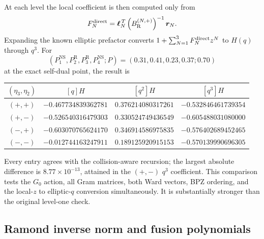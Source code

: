 \documentclass[11pt]{article}
\newcommand{\NS}{\mathrm{NS}}
\newcommand{\R}{\mathrm{R}}
\begin{document}
At each level the local coefficient is then computed only from
\begin{equation}
 F_N^{\rm direct}
 =\boldsymbol\ell_N^{\,T}
 \left(B_{\R}^{(N,+)}\right)^{-1}
 \boldsymbol r_N.
 \label{eq:r-direct-level-n}
\end{equation}
Expanding the known elliptic prefactor converts
$1+\sum_{N=1}^3F_N^{\rm direct}z^N$ to $H(q)$ through $q^3$.  For
\begin{equation}
 (P_1^{\NS},P_2^{\R},P_3^{\R},P_4^{\NS};P)
 =(0.31,0.41,0.23,0.37;0.70)
 \end{equation}
at the exact self-dual point, the result is
\begin{center}
\begin{tabular}{@{}cccc@{}}
\toprule
$(\eta_3,\eta_2)$ & $[q]H$ & $[q^2]H$ & $[q^3]H$\\
\midrule
$(+,+)$ & $-0.467734839362781$ & $0.376214080317261$
 & $-0.532846461739354$\\
$(+,-)$ & $-0.526540316479303$ & $0.330524749436549$
 & $-0.605488031080000$\\
$(-,+)$ & $-0.603070765624170$ & $0.346914586975835$
 & $-0.576402689452465$\\
$(-,-)$ & $-0.012744163247911$ & $0.189125920915153$
 & $-0.570139990696305$\\
\bottomrule
\end{tabular}
\end{center}
Every entry agrees with the collision-aware recursion; the largest absolute
difference is $8.77\times10^{-13}$, attained in the $(+,-)$ $q^3$
coefficient.  This comparison tests the $G_0$ action, all Gram matrices,
both Ward vectors, BPZ ordering, and the local-$z$ to elliptic-$q$
conversion simultaneously.  It is substantially stronger than the original
level-one check.

\subsection{Ramond inverse norm and fusion polynomials}
\label{sec:r-fusion}
\end{document}
